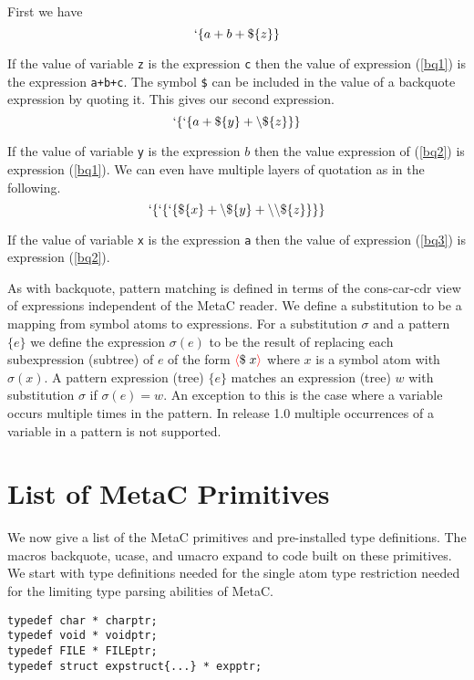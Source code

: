 \documentclass{article}
\newcommand{\fopen}{{\color{red} \langle}}
\newcommand{\fclose}{{\color{red} \rangle}}
\begin{document}
First we have
\begin{equation}
\label{bq1}
`\{a+b+\$\{z\}\}
\end{equation}

If the value of variable {\tt z} is the expression {\tt c} then the value of expression (\ref{bq1}) is the expression {\tt a+b+c}.
The symbol {\tt \$} can be included in the value of a backquote expression by quoting it.  This gives our second expression.
\begin{equation}
\label{bq2}
`\{`\{a + \$\{y\} + \backslash\$\{z\}\}\}
\end{equation}

If the value of variable {\tt y} is the expression $b$ then the value expression of (\ref{bq2}) is expression (\ref{bq1}).
We can even have multiple layers of quotation as in the following.
\begin{equation}
\label{bq3}
`\{`\{`\{\$\{x\} + \backslash\$\{y\} + \backslash\backslash\$\{z\}\}\}\}
\end{equation}

If the value of variable {\tt x} is the expression {\tt a} then the value of expression (\ref{bq3}) is expression (\ref{bq2}).

As with backquote, pattern matching is defined in terms of the cons-car-cdr view of expressions independent of the MetaC reader.  We define a substitution to be a mapping from
symbol atoms to expressions. For a substitution $\sigma$ and a pattern $\{e\}$ we define the expression $\sigma(e)$
to be the result of replacing each subexpression (subtree) of $e$ of the form $\fopen \$\;x \fclose$ where $x$ is a symbol atom with $\sigma(x)$.  A pattern expression (tree) $\{e\}$ matches an expression (tree) $w$ with substitution $\sigma$
if $\sigma(e) = w$. An exception to this is the case where a variable occurs multiple times in the pattern.  In release 1.0 multiple occurrences of a variable in a pattern is not supported.

\section{List of MetaC Primitives}

We now give a list of the MetaC primitives and pre-installed type definitions.  The macros backquote, ucase, and umacro expand to code built on these primitives.
We start with type definitions needed for the single atom type restriction needed for the limiting type parsing abilities of MetaC.

\begin{verbatim}
typedef char * charptr;
typedef void * voidptr;
typedef FILE * FILEptr;
typedef struct expstruct{...} * expptr;
\end{verbatim}
\end{document}
